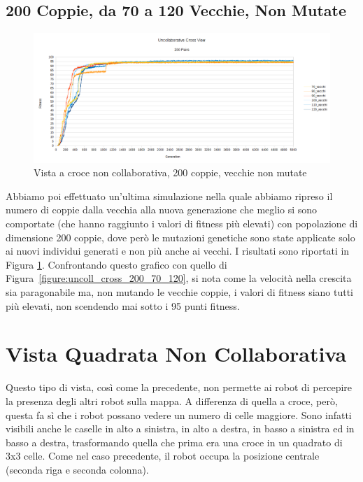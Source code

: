 \subsection{200 Coppie, da 70 a 120 Vecchie, Non Mutate}
\begin{figure}[ht]
	\centering
	\includegraphics[scale=0.7,angle=90]{imgs/uncollaborative_cross_200_pairs_70_120_vecchi_solo_nuovi_mutati.png}
	\caption{Vista a croce non collaborativa, 200 coppie, vecchie non mutate}
	\label{figure:uncoll_cross_200_70_120_vecchi_non_mutati}
\end{figure}
Abbiamo poi effettuato un'ultima simulazione nella quale abbiamo ripreso il
numero di coppie dalla vecchia alla nuova generazione che meglio si sono
comportate (che hanno raggiunto i valori di fitness più elevati) con popolazione
di dimensione 200 coppie, dove però le mutazioni genetiche sono state applicate
solo ai nuovi individui generati e non più anche ai vecchi.\newline
I risultati sono riportati in Figura
\ref{figure:uncoll_cross_200_70_120_vecchi_non_mutati}. Confrontando questo
grafico con quello di Figura~\ref{figure:uncoll_cross_200_70_120}, si nota come
la velocità nella crescita sia paragonabile ma, non mutando le vecchie coppie, i
valori di fitness siano tutti più elevati, non scendendo mai sotto i 95 punti
fitness.



\clearpage



\section{Vista Quadrata Non Collaborativa}
Questo tipo di vista, così come la precedente, non permette ai robot di
percepire la presenza degli altri robot sulla mappa. A differenza di quella a
croce, però, questa fa sì che i robot possano vedere un numero di celle
maggiore. Sono infatti visibili anche le caselle in alto a sinistra, in alto a
destra, in basso a sinistra ed in basso a destra, trasformando quella che prima
era una croce in un quadrato di 3x3 celle. Come nel caso precedente, il robot
occupa la posizione centrale (seconda riga e seconda colonna).

